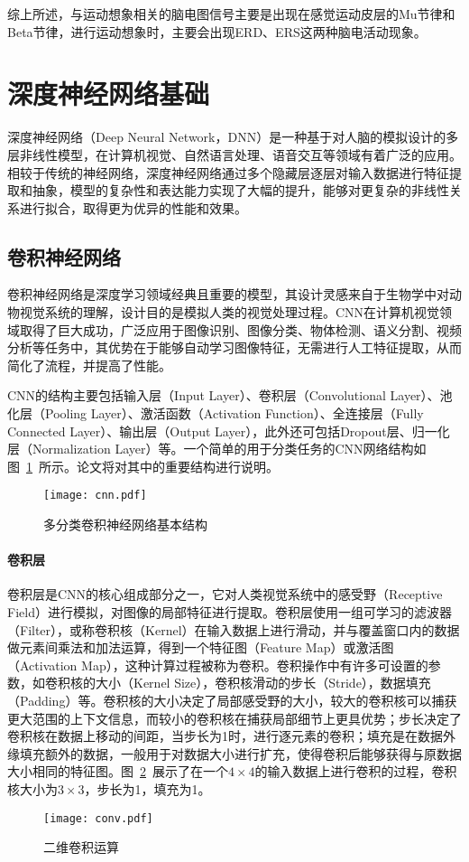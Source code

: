 综上所述，与运动想象相关的脑电图信号主要是出现在感觉运动皮层的Mu节律和Beta节律，进行运动想象时，主要会出现ERD、ERS这两种脑电活动现象。

\section{深度神经网络基础}

深度神经网络（Deep Neural Network，DNN）是一种基于对人脑的模拟设计的多层非线性模型，在计算机视觉、自然语言处理、语音交互等领域有着广泛的应用。相较于传统的神经网络，深度神经网络通过多个隐藏层逐层对输入数据进行特征提取和抽象，模型的复杂性和表达能力实现了大幅的提升，能够对更复杂的非线性关系进行拟合，取得更为优异的性能和效果。

\subsection{卷积神经网络}

卷积神经网络是深度学习领域经典且重要的模型，其设计灵感来自于生物学中对动物视觉系统的理解，设计目的是模拟人类的视觉处理过程。CNN在计算机视觉领域取得了巨大成功，广泛应用于图像识别、图像分类、物体检测、语义分割、视频分析等任务中，其优势在于能够自动学习图像特征，无需进行人工特征提取，从而简化了流程，并提高了性能。

CNN的结构主要包括输入层（Input Layer）、卷积层（Convolutional Layer）、池化层（Pooling Layer）、激活函数（Activation Function）、全连接层（Fully Connected Layer）、输出层（Output Layer），此外还可包括Dropout层、归一化层（Normalization Layer）等。一个简单的用于分类任务的CNN网络结构如图~\ref{fig:cnn}~所示。论文将对其中的重要结构进行说明。
\begin{figure}[ht]
    \centering
    \texttt{[image: cnn.pdf]}
    \caption{多分类卷积神经网络基本结构}
    \label{fig:cnn}
\end{figure}

\paragraph{卷积层}

卷积层是CNN的核心组成部分之一，它对人类视觉系统中的感受野（Receptive Field）进行模拟，对图像的局部特征进行提取。卷积层使用一组可学习的滤波器（Filter），或称卷积核（Kernel）在输入数据上进行滑动，并与覆盖窗口内的数据做元素间乘法和加法运算，得到一个特征图（Feature Map）或激活图（Activation Map），这种计算过程被称为卷积。卷积操作中有许多可设置的参数，如卷积核的大小（Kernel Size），卷积核滑动的步长（Stride），数据填充（Padding）等。卷积核的大小决定了局部感受野的大小，较大的卷积核可以捕获更大范围的上下文信息，而较小的卷积核在捕获局部细节上更具优势；步长决定了卷积核在数据上移动的间距，当步长为1时，进行逐元素的卷积；填充是在数据外缘填充额外的数据，一般用于对数据大小进行扩充，使得卷积后能够获得与原数据大小相同的特征图。图~\ref{fig:conv}~展示了在一个\(4\times4\)的输入数据上进行卷积的过程，卷积核大小为\(3\times3\)，步长为1，填充为1。
\begin{figure}[ht]
    \centering
    \texttt{[image: conv.pdf]}
    \caption{二维卷积运算}
    \label{fig:conv}
\end{figure}

